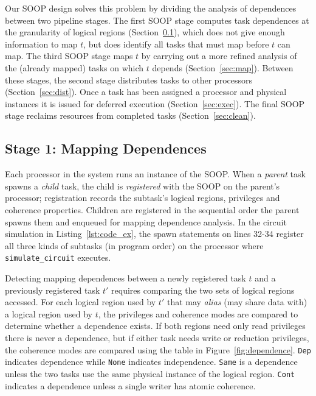 Our SOOP design solves this problem by dividing the analysis of
dependences between two pipeline stages.  The first SOOP stage
computes task dependences at the granularity of logical regions
(Section~\ref{sec:dep}), which does not give enough information to map
$t$, but does identify all tasks that must map before $t$ can map.
The third SOOP stage maps $t$ by carrying out a more refined analysis
of the (already mapped) tasks on which $t$ depends
(Section~\ref{sec:map}).  Between these stages, the second stage
distributes tasks to other processors (Section~\ref{sec:dist}).  Once
a task has been assigned a processor and physical instances it is
issued for deferred execution (Section~\ref{sec:exec}).  The final
SOOP stage reclaims resources from completed tasks
(Section~\ref{sec:clean}).

\subsection{Stage 1: Mapping Dependences}
\label{sec:dep}



Each processor in the system runs an instance of the SOOP.
When a {\em parent} task spawns a {\em child} task, the child is {\em registered}
with the SOOP on the parent's processor;
registration records the subtask's logical regions,
privileges and coherence properties.  Children are
registered in the sequential order the parent
spawns them and enqueued for mapping dependence analysis.  In the
circuit simulation in Listing~\ref{lst:code_ex}, the spawn
statements on lines 32-34 register all three
kinds of subtasks (in program order) on the processor where {\tt
simulate\_circuit} executes.

Detecting mapping dependences between a newly registered task $t$ and
a previously registered task $t'$ requires comparing the two sets of
logical regions accessed.  For each logical region used by $t'$ that
may {\em alias} (may share data with) a logical region used by $t$, the privileges and
coherence modes are compared to determine whether a dependence exists.
If both regions need only read privileges there is never a dependence,
but if either task needs write or reduction privileges, the coherence
modes are compared using the table in Figure~\ref{fig:dependence}.
{\tt Dep} indicates dependence while {\tt None}
indicates independence.  {\tt Same} is a dependence unless the two tasks
use the same physical instance of the logical region.
{\tt Cont} 
indicates a dependence unless a single writer has
atomic coherence.  


